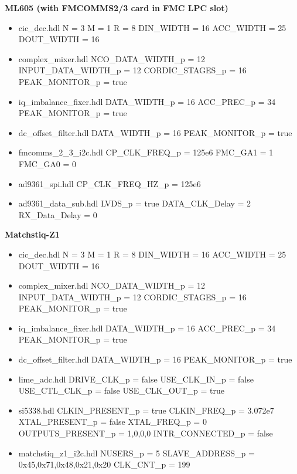 \begin{minipage}[t]{.5\textwidth}
	\textbf{ML605 (with FMCOMMS2/3 card in FMC LPC slot)}
	\begin{itemize}
		\item cic\_dec.hdl
			\subitem N = 3
			\subitem M = 1
			\subitem R = 8
			\subitem DIN\_WIDTH = 16
			\subitem ACC\_WIDTH = 25
			\subitem DOUT\_WIDTH = 16
		\item complex\_mixer.hdl
			\subitem NCO\_DATA\_WIDTH\_p = 12
			\subitem INPUT\_DATA\_WIDTH\_p = 12
			\subitem CORDIC\_STAGES\_p = 16
			\subitem PEAK\_MONITOR\_p = true
		\item iq\_imbalance\_fixer.hdl
			\subitem DATA\_WIDTH\_p = 16
			\subitem ACC\_PREC\_p = 34
			\subitem PEAK\_MONITOR\_p = true
		\item dc\_offset\_filter.hdl
			\subitem DATA\_WIDTH\_p = 16
			\subitem PEAK\_MONITOR\_p = true
		\item fmcomms\_2\_3\_i2c.hdl
			\subitem CP\_CLK\_FREQ\_p = 125e6
			\subitem FMC\_GA1 = 1
			\subitem FMC\_GA0 = 0
		\item ad9361\_spi.hdl
			\subitem CP\_CLK\_FREQ\_HZ\_p = 125e6
		\item ad9361\_data\_sub.hdl
			\subitem LVDS\_p = true
			\subitem DATA\_CLK\_Delay = 2
			\subitem RX\_Data\_Delay = 0
	\end{itemize}
\end{minipage}
\begin{minipage}[t]{.5\textwidth}
	\textbf{Matchstiq-Z1}
	\begin{itemize}
		\item cic\_dec.hdl
			\subitem N = 3
			\subitem M = 1
			\subitem R = 8
			\subitem DIN\_WIDTH = 16
			\subitem ACC\_WIDTH = 25
			\subitem DOUT\_WIDTH = 16
		\item complex\_mixer.hdl
			\subitem NCO\_DATA\_WIDTH\_p = 12
			\subitem INPUT\_DATA\_WIDTH\_p = 12
			\subitem CORDIC\_STAGES\_p = 16
			\subitem PEAK\_MONITOR\_p = true
		\item iq\_imbalance\_fixer.hdl
			\subitem DATA\_WIDTH\_p = 16
			\subitem ACC\_PREC\_p = 34
			\subitem PEAK\_MONITOR\_p = true
		\item dc\_offset\_filter.hdl
			\subitem DATA\_WIDTH\_p = 16
			\subitem PEAK\_MONITOR\_p = true
		\item lime\_adc.hdl
			\subitem DRIVE\_CLK\_p = false
			\subitem USE\_CLK\_IN\_p = false
			\subitem USE\_CTL\_CLK\_p = false
			\subitem USE\_CLK\_OUT\_p = true
		\item si5338.hdl
			\subitem CLKIN\_PRESENT\_p = true
			\subitem CLKIN\_FREQ\_p = 3.072e7
			\subitem XTAL\_PRESENT\_p = false
			\subitem XTAL\_FREQ\_p = 0
			\subitem OUTPUTS\_PRESENT\_p = 1,0,0,0
			\subitem INTR\_CONNECTED\_p = false
		\item matchstiq\_z1\_i2c.hdl
			\subitem NUSERS\_p = 5
			\subitem SLAVE\_ADDRESS\_p = 0x45,0x71,0x48,0x21,0x20
			\subitem CLK\_CNT\_p = 199
	\end{itemize}
\end{minipage}


